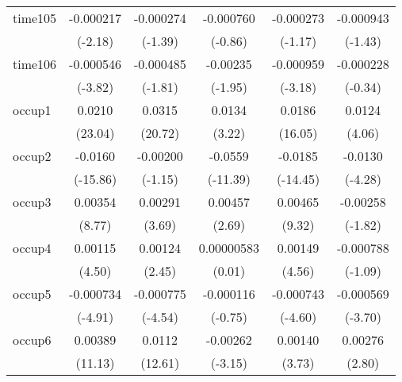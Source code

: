 \begin{table}[htbp]
\begin{tabular}{l*{5}{c}}
time105     &   -0.000217\sym{*}  &   -0.000274         &   -0.000760         &   -0.000273         &   -0.000943         \\
            &     (-2.18)         &     (-1.39)         &     (-0.86)         &     (-1.17)         &     (-1.43)         \\
time106     &   -0.000546\sym{***}&   -0.000485         &    -0.00235         &   -0.000959\sym{**} &   -0.000228         \\
            &     (-3.82)         &     (-1.81)         &     (-1.95)         &     (-3.18)         &     (-0.34)         \\
occup1      &      0.0210\sym{***}&      0.0315\sym{***}&      0.0134\sym{**} &      0.0186\sym{***}&      0.0124\sym{***}\\
            &     (23.04)         &     (20.72)         &      (3.22)         &     (16.05)         &      (4.06)         \\
occup2      &     -0.0160\sym{***}&    -0.00200         &     -0.0559\sym{***}&     -0.0185\sym{***}&     -0.0130\sym{***}\\
            &    (-15.86)         &     (-1.15)         &    (-11.39)         &    (-14.45)         &     (-4.28)         \\
occup3      &     0.00354\sym{***}&     0.00291\sym{***}&     0.00457\sym{**} &     0.00465\sym{***}&    -0.00258         \\
            &      (8.77)         &      (3.69)         &      (2.69)         &      (9.32)         &     (-1.82)         \\
occup4      &     0.00115\sym{***}&     0.00124\sym{*}  &  0.00000583         &     0.00149\sym{***}&   -0.000788         \\
            &      (4.50)         &      (2.45)         &      (0.01)         &      (4.56)         &     (-1.09)         \\
occup5      &   -0.000734\sym{***}&   -0.000775\sym{***}&   -0.000116         &   -0.000743\sym{***}&   -0.000569\sym{***}\\
            &     (-4.91)         &     (-4.54)         &     (-0.75)         &     (-4.60)         &     (-3.70)         \\
occup6      &     0.00389\sym{***}&      0.0112\sym{***}&    -0.00262\sym{**} &     0.00140\sym{***}&     0.00276\sym{**} \\
            &     (11.13)         &     (12.61)         &     (-3.15)         &      (3.73)         &      (2.80)         \\

\end{tabular}
\end{table}
